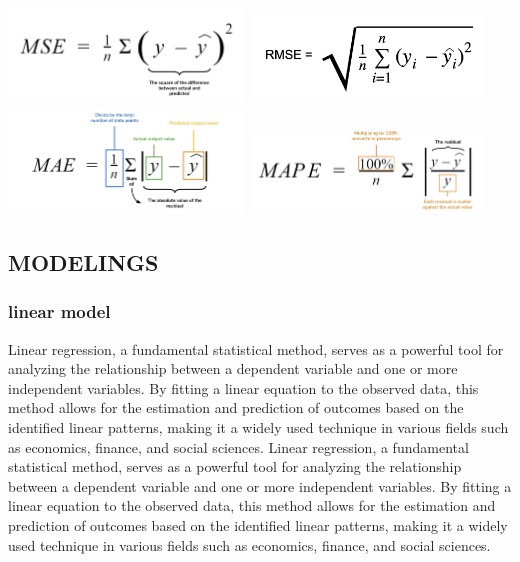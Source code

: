 \documentclass{ieeeojies}
\begin{document}
\includegraphics[width=0.47\textwidth]{MSE.jpg}
\includegraphics[width=0.47\textwidth]{RMSE.png}
\includegraphics[width=0.47\textwidth]{MAE.jpg}
\includegraphics[width=0.47\textwidth]{MAPE.jpg}

\subsection{MODELINGS}
\subsubsection{linear model}
Linear regression, a fundamental statistical method, serves as a powerful tool for analyzing the relationship between a dependent variable and one or more independent variables. By fitting a linear equation to the observed data, this method allows for the estimation and prediction of outcomes based on the identified linear patterns, making it a widely used technique in various fields such as economics, finance, and social sciences.
Linear regression, a fundamental statistical method, serves as a powerful tool for analyzing the relationship between a dependent variable and one or more independent variables. By fitting a linear equation to the observed data, this method allows for the estimation and prediction of outcomes based on the identified linear patterns, making it a widely used technique in various fields such as economics, finance, and social sciences. \cite{a1}
\end{document}
